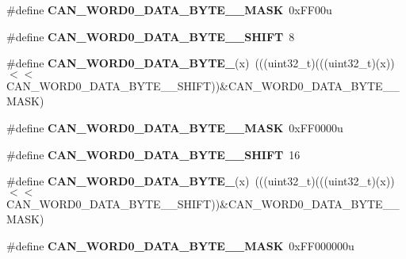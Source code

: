 \begin{DoxyCompactItemize}
\item 
\#define {\bfseries C\+A\+N\+\_\+\+W\+O\+R\+D0\+\_\+\+D\+A\+T\+A\+\_\+\+B\+Y\+T\+E\+\_\+\_\+\+M\+A\+SK}~0x\+F\+F00u\hypertarget{group__CAN__Register__Masks_gaf5ac3a0da0156c6c331ae39e688d1a6b}{}\label{group__CAN__Register__Masks_gaf5ac3a0da0156c6c331ae39e688d1a6b}

\item 
\#define {\bfseries C\+A\+N\+\_\+\+W\+O\+R\+D0\+\_\+\+D\+A\+T\+A\+\_\+\+B\+Y\+T\+E\+\_\+\_\+\+S\+H\+I\+FT}~8\hypertarget{group__CAN__Register__Masks_ga30489eaec721b5f42b721c65d8c0cf67}{}\label{group__CAN__Register__Masks_ga30489eaec721b5f42b721c65d8c0cf67}

\item 
\#define {\bfseries C\+A\+N\+\_\+\+W\+O\+R\+D0\+\_\+\+D\+A\+T\+A\+\_\+\+B\+Y\+T\+E\+\_}(x)~(((uint32\+\_\+t)(((uint32\+\_\+t)(x))$<$$<$C\+A\+N\+\_\+\+W\+O\+R\+D0\+\_\+\+D\+A\+T\+A\+\_\+\+B\+Y\+T\+E\+\_\+\_\+\+S\+H\+I\+FT))\&C\+A\+N\+\_\+\+W\+O\+R\+D0\+\_\+\+D\+A\+T\+A\+\_\+\+B\+Y\+T\+E\+\_\+\_\+\+M\+A\+SK)\hypertarget{group__CAN__Register__Masks_ga091cd1ebb0220a7f7aae9c78ee77d195}{}\label{group__CAN__Register__Masks_ga091cd1ebb0220a7f7aae9c78ee77d195}

\item 
\#define {\bfseries C\+A\+N\+\_\+\+W\+O\+R\+D0\+\_\+\+D\+A\+T\+A\+\_\+\+B\+Y\+T\+E\+\_\+\_\+\+M\+A\+SK}~0x\+F\+F0000u\hypertarget{group__CAN__Register__Masks_ga9e7f294cbdc5772dc2de56ec615eb695}{}\label{group__CAN__Register__Masks_ga9e7f294cbdc5772dc2de56ec615eb695}

\item 
\#define {\bfseries C\+A\+N\+\_\+\+W\+O\+R\+D0\+\_\+\+D\+A\+T\+A\+\_\+\+B\+Y\+T\+E\+\_\+\_\+\+S\+H\+I\+FT}~16\hypertarget{group__CAN__Register__Masks_ga93129c7dd5f1db1583bf5110179d7a4e}{}\label{group__CAN__Register__Masks_ga93129c7dd5f1db1583bf5110179d7a4e}

\item 
\#define {\bfseries C\+A\+N\+\_\+\+W\+O\+R\+D0\+\_\+\+D\+A\+T\+A\+\_\+\+B\+Y\+T\+E\+\_}(x)~(((uint32\+\_\+t)(((uint32\+\_\+t)(x))$<$$<$C\+A\+N\+\_\+\+W\+O\+R\+D0\+\_\+\+D\+A\+T\+A\+\_\+\+B\+Y\+T\+E\+\_\+\_\+\+S\+H\+I\+FT))\&C\+A\+N\+\_\+\+W\+O\+R\+D0\+\_\+\+D\+A\+T\+A\+\_\+\+B\+Y\+T\+E\+\_\+\_\+\+M\+A\+SK)\hypertarget{group__CAN__Register__Masks_gab354cb64d4a5a33952bba439d4fc36a6}{}\label{group__CAN__Register__Masks_gab354cb64d4a5a33952bba439d4fc36a6}

\item 
\#define {\bfseries C\+A\+N\+\_\+\+W\+O\+R\+D0\+\_\+\+D\+A\+T\+A\+\_\+\+B\+Y\+T\+E\+\_\+\_\+\+M\+A\+SK}~0x\+F\+F000000u\hypertarget{group__CAN__Register__Masks_ga850d4e3257b02cacead5d9e2b757818c}{}\label{group__CAN__Register__Masks_ga850d4e3257b02cacead5d9e2b757818c}


\end{DoxyCompactItemize}
